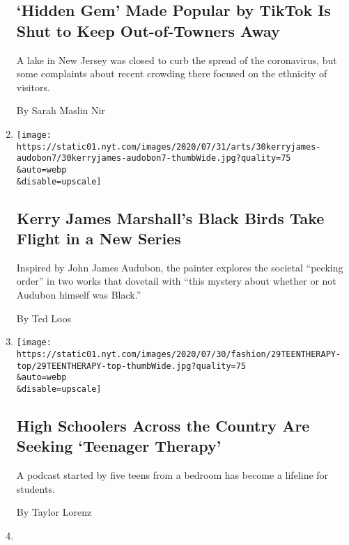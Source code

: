 \begin{enumerate}
{  \subsection{`Hidden Gem' Made Popular by TikTok Is Shut to Keep
  Out-of-Towners
  Away}\label{hidden-gem-made-popular-by-tiktok-is-shut-to-keep-out-of-towners-away}}

  A lake in New Jersey was closed to curb the spread of the coronavirus,
  but some complaints about recent crowding there focused on the
  ethnicity of visitors.

  By Sarah Maslin Nir
\item
  \href{/2020/07/29/arts/design/kerry-james-marshall-audubon.html}{}

  \texttt{[image: https://static01.nyt.com/images/2020/07/31/arts/30kerryjames-audobon7/30kerryjames-audobon7-thumbWide.jpg?quality=75\\\&auto=webp\\\&disable=upscale]}

  \hypertarget{kerry-james-marshalls-black-birds-take-flight-in-a-new-series}{%
  \subsection{Kerry James Marshall's Black Birds Take Flight in a New
  Series}\label{kerry-james-marshalls-black-birds-take-flight-in-a-new-series}}

  Inspired by John James Audubon, the painter explores the societal
  ``pecking order'' in two works that dovetail with ``this mystery about
  whether or not Audubon himself was Black.''

  By Ted Loos
\item
  \href{/2020/07/29/style/teenager-therapy-podcast.html}{}

  \texttt{[image: https://static01.nyt.com/images/2020/07/30/fashion/29TEENTHERAPY-top/29TEENTHERAPY-top-thumbWide.jpg?quality=75\\\&auto=webp\\\&disable=upscale]}

  \hypertarget{high-schoolers-across-the-country-are-seeking-teenager-therapy-1}{%
  \subsection{High Schoolers Across the Country Are Seeking `Teenager
  Therapy'}\label{high-schoolers-across-the-country-are-seeking-teenager-therapy-1}}

  A podcast started by five teens from a bedroom has become a lifeline
  for students.

  By Taylor Lorenz
\item
  \href{/2020/07/29/style/secondhand-clothes-coronavirus-safety.html}{}


\end{enumerate}
